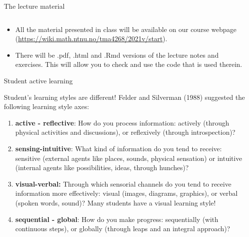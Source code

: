 \documentclass[10pt,ignorenonframetext,]{beamer}
\providecommand{\tightlist}{%
  \setlength{\itemsep}{0pt}\setlength{\parskip}{0pt}}
\begin{document}
\begin{frame}

\begin{block}{The lecture material}

\(~\)

\begin{itemize}
\tightlist
\item
  All the material presented in class will be available on our course
  webpage (\url{https://wiki.math.ntnu.no/tma4268/2021v/start}).
\end{itemize}

\vspace{2mm}

\begin{itemize}
\tightlist
\item
  There will be .pdf, .html and .Rmd versions of the lecture notes and
  exercises. This will allow you to check and use the code that is used
  therein.
\end{itemize}

\end{block}

\end{frame}

\begin{frame}{Student active learning}
\protect\hypertarget{student-active-learning}{}

Student's learning styles are different! Felder and Silverman (1988)
suggested the following learning style axes:

\begin{enumerate}
[1)]
\item
  \textbf{active - reflective}: How do you process information: actively
  (through physical activities and discussions), or reflexively (through
  introspection)?
\item
  \textbf{sensing-intuitive}: What kind of information do you tend to
  receive: sensitive (external agents like places, sounds, physical
  sensation) or intuitive (internal agents like possibilities, ideas,
  through hunches)?
\item
  \textbf{visual-verbal:} Through which sensorial channels do you tend
  to receive information more effectively: visual (images, diagrams,
  graphics), or verbal (spoken words, sound)? Many students have a
  visual learning style!
\item
  \textbf{sequential - global}: How do you make progress: sequentially
  (with continuous steps), or globally (through leaps and an integral
  approach)?
\end{enumerate}

\end{frame}
\end{document}

